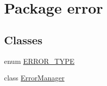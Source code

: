 \hypertarget{namespaceerror}{\section{Package error}
\label{namespaceerror}
}
\subsection*{Classes}
\begin{DoxyCompactItemize}
\item 
enum \hyperlink{enumerror_1_1_e_r_r_o_r___t_y_p_e}{E\-R\-R\-O\-R\-\_\-\-T\-Y\-P\-E}
\item 
class \hyperlink{classerror_1_1_error_manager}{Error\-Manager}
\end{DoxyCompactItemize}

